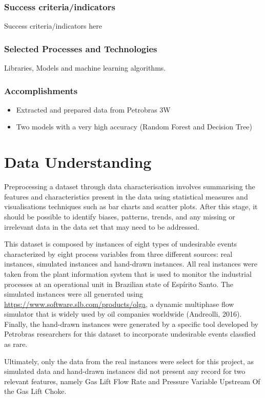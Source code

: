 \documentclass{article}
\begin{document}
\subsubsection{Success criteria/indicators}
Success criteria/indicators here

\subsubsection{Selected Processes and Technologies}
Libraries, Models and machine learning algorithms.

\subsubsection{Accomplishments}
\begin{itemize}
\item Extracted and prepared data from Petrobras 3W
\item Two models with a very high accuracy (Random Forest and Decision Tree)
\end{itemize}

\section{Data Understanding}

Preprocessing a dataset through data characterisation involves summarising the features and characteristics present in the data using statistical measures and visualisations techniques such as bar charts and scatter plots. After this stage, it should be possible to identify biases, patterns, trends, and any missing or irrelevant data in the data set that may need to be addressed.

This dataset is composed by instances of eight types of undesirable events characterized by eight process variables from three different sources: real instances, simulated instances and hand-drawn instances. All real instances were taken from the plant information system that is used to monitor the industrial processes at an operational unit in Brazilian state of Espírito Santo. The simulated instances were all generated using \href{OLGA}{https://www.software.slb.com/products/olga}, a dynamic multiphase flow simulator that is widely used by oil companies worldwide (Andreolli, 2016). Finally, the hand-drawn instances were generated by a specific tool developed by Petrobras researchers for this dataset to incorporate undesirable events classfied as rare.

Ultimately, only the data from the real instances were select for this project, as simulated data and hand-drawn instances did not present any record for two relevant features, namely Gas Lift Flow Rate and Pressure Variable Upstream Of the Gas Lift Choke.
\end{document}
